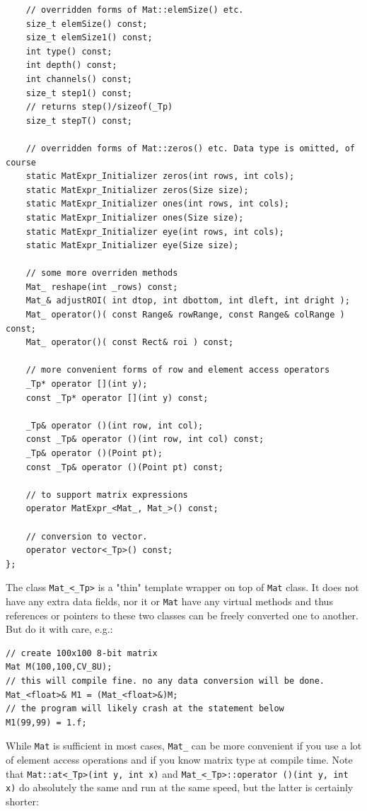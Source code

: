 \begin{lstlisting}
    // overridden forms of Mat::elemSize() etc.
    size_t elemSize() const;
    size_t elemSize1() const;
    int type() const;
    int depth() const;
    int channels() const;
    size_t step1() const;
    // returns step()/sizeof(_Tp)
    size_t stepT() const;

    // overridden forms of Mat::zeros() etc. Data type is omitted, of course
    static MatExpr_Initializer zeros(int rows, int cols);
    static MatExpr_Initializer zeros(Size size);
    static MatExpr_Initializer ones(int rows, int cols);
    static MatExpr_Initializer ones(Size size);
    static MatExpr_Initializer eye(int rows, int cols);
    static MatExpr_Initializer eye(Size size);

    // some more overriden methods
    Mat_ reshape(int _rows) const;
    Mat_& adjustROI( int dtop, int dbottom, int dleft, int dright );
    Mat_ operator()( const Range& rowRange, const Range& colRange ) const;
    Mat_ operator()( const Rect& roi ) const;

    // more convenient forms of row and element access operators 
    _Tp* operator [](int y);
    const _Tp* operator [](int y) const;

    _Tp& operator ()(int row, int col);
    const _Tp& operator ()(int row, int col) const;
    _Tp& operator ()(Point pt);
    const _Tp& operator ()(Point pt) const;

    // to support matrix expressions
    operator MatExpr_<Mat_, Mat_>() const;
    
    // conversion to vector.
    operator vector<_Tp>() const;
};
\end{lstlisting}

The class \texttt{Mat\_<\_Tp>} is a "thin" template wrapper on top of \texttt{Mat} class. It does not have any extra data fields, nor it or \texttt{Mat} have any virtual methods and thus references or pointers to these two classes can be freely converted one to another. But do it with care, e.g.:

\begin{lstlisting}
// create 100x100 8-bit matrix
Mat M(100,100,CV_8U);
// this will compile fine. no any data conversion will be done.
Mat_<float>& M1 = (Mat_<float>&)M;
// the program will likely crash at the statement below
M1(99,99) = 1.f;
\end{lstlisting}

While \texttt{Mat} is sufficient in most cases, \texttt{Mat\_} can be more convenient if you use a lot of element access operations and if you know matrix type at compile time. Note that \texttt{Mat::at<\_Tp>(int y, int x)} and \texttt{Mat\_<\_Tp>::operator ()(int y, int x)} do absolutely the same and run at the same speed, but the latter is certainly shorter:


